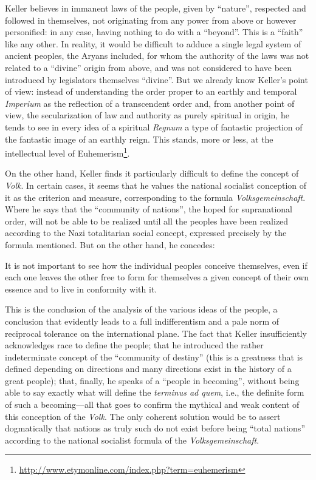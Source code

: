 Keller believes in immanent laws of the people, given by ``nature'', respected and followed in themselves, not originating from any power from above or however personified: in any case, having nothing to do with a ``beyond''. This is a ``faith'' like any other. In reality, it would be difficult to adduce a single legal system of ancient peoples, the Aryans included, for whom the authority of the laws was not related to a ``divine'' origin from above, and was not considered to have been introduced by legislators themselves ``divine''. But we already know Keller's point of view: instead of understanding the order proper to an earthly and temporal \emph{Imperium} as the reflection of a transcendent order and, from another point of view, the secularization of law and authority as purely spiritual in origin, he tends to see in every idea of a spiritual \emph{Regnum} a type of fantastic projection of the fantastic image of an earthly reign. This stands, more or less, at the intellectual level of Euhemerism\footnote{\url{http://www.etymonline.com/index.php?term=euhemerism}}.

On the other hand, Keller finds it particularly difficult to define the concept of \emph{Volk}. In certain cases, it seems that he values the national socialist conception of it as the criterion and measure, corresponding to the formula \emph{Volksgemeinschaft}. Where he says that the ``community of nations'', the hoped for supranational order, will not be able to be realized until all the peoples have been realized according to the Nazi totalitarian social concept, expressed precisely by the formula mentioned. But on the other hand, he concedes:

\begin{quotex}
It is not important to see how the individual peoples conceive themselves, even if each one leaves the other free to form for themselves a given concept of their own essence and to live in conformity with it.
\end{quotex}


This is the conclusion of the analysis of the various ideas of the people, a conclusion that evidently leads to a full indifferentism and a pale norm of reciprocal tolerance on the international plane. The fact that Keller insufficiently acknowledges race to define the people; that he introduced the rather indeterminate concept of the ``community of destiny'' (this is a greatness that is defined depending on directions and many directions exist in the history of a great people); that, finally, he speaks of a ``people in becoming'', without being able to say exactly what will define the \emph{terminus ad quem}, i.e., the definite form of such a becoming---all that goes to confirm the mythical and weak content of this conception of the \emph{Volk}. The only coherent solution would be to assert dogmatically that nations as truly such do not exist before being ``total nations'' according to the national socialist formula of the \emph{Volksgemeinschaft}.

